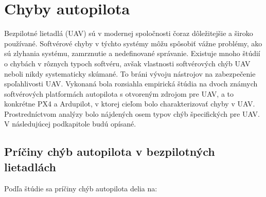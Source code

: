\documentclass[10pt,twoside,slovak,a4paper]{article}
\begin{document}
\section{Chyby autopilota} \label{chyby}

Bezpilotné lietadlá (UAV) sú v modernej spoločnosti čoraz dôležitejšie a široko používané. Softvérové chyby v týchto systémy môžu spôsobiť vážne problémy, ako sú zlyhania systému, zamrznutie a nedefinované správanie. Existuje mnoho štúdií o chybách v rôznych typoch softvéru, avšak vlastnosti softvérových chýb UAV neboli nikdy systematicky skúmané. To bráni vývoju nástrojov na zabezpečenie spoľahlivosti UAV. Vykonaná bola rozsiahla empirická štúdia na dvoch známych softvérových platformách autopilota s otvoreným zdrojom pre UAV, a to konkrétne PX4 a Ardupilot, v ktorej cieľom bolo charakterizovať chyby v UAV. Prostredníctvom analýzy bolo nájdených osem typov chýb špecifických pre UAV. V následujúcej podkapitole budú opísané.\cite{chybyautopilot}

\subsection{Príčiny chýb autopilota v bezpilotných lietadlách}

Podľa štúdie sa príčiny chýb autopilota delia na:
\end{document}
